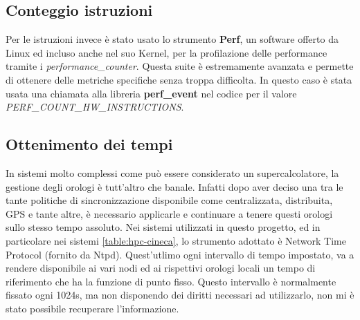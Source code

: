 \subsection{Conteggio istruzioni}
Per le istruzioni invece è stato usato lo strumento \textbf{Perf}, un software offerto da Linux ed incluso anche nel suo \gls{Kernel}, per la profilazione delle performance tramite i \emph{performance\_counter}. Questa suite è estremamente avanzata e permette di ottenere delle metriche specifiche senza troppa difficolta. In questo caso è stata usata una chiamata alla libreria \textbf{perf\_event} nel codice per il valore \emph{PERF\_COUNT\_HW\_INSTRUCTIONS}.

\subsection{Ottenimento dei tempi}
In sistemi molto complessi come può essere considerato un supercalcolatore, la gestione degli orologi è tutt'altro che banale. Infatti dopo aver deciso una tra le tante politiche di sincronizzazione disponibile come centralizzata, distribuita, GPS e tante altre, è necessario applicarle e continuare a tenere questi orologi sullo stesso tempo assoluto. Nei sistemi utilizzati in questo progetto, ed in particolare nei sistemi \ref{table:hpc-cineca}, lo strumento adottato è Network Time Protocol (fornito da \gls{Ntpd}). Quest'utlimo ogni intervallo di tempo impostato, va a rendere disponibile ai vari nodi ed ai rispettivi orologi locali un tempo di riferimento che ha la funzione di punto fisso. Questo intervallo è normalmente fissato ogni 1024s, ma non disponendo dei diritti necessari ad utilizzarlo, non mi è stato possibile recuperare l'informazione.

